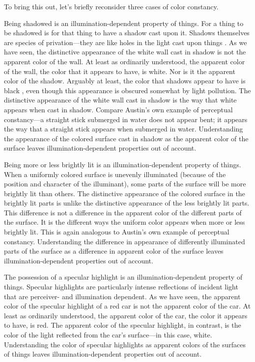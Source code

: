 \documentclass[12pt]{article}
\begin{document}
To bring this out, let's briefly reconsider three cases of color constancy.

Being shadowed is an illumination-dependent property of things. For a thing to be shadowed is for that thing to have a shadow cast upon it. Shadows themselves are species of privation---they are like holes in the light cast upon things \citep[see][]{Sorensen:2008kx}. As we have seen, the distinctive appearance of the white wall cast in shadow is not the apparent color of the wall. At least as ordinarily understood, the apparent color of the wall, the color that it appears to have, is white. Nor is it the apparent color of the shadow. Arguably at least, the color that shadows appear to have is black \citep{Sorensen:2008kx}, even though this appearance is obscured somewhat by light pollution. The distinctive appearance of the white wall cast in shadow is the way that white appears when cast in shadow. Compare Austin's \citeyearpar{Austin:1962lr} own example of perceptual constancy---a straight stick submerged in water does not appear bent; it appears the way that a straight stick appears when submerged in water. Understanding the appearance of the colored surface cast in shadow as the apparent color of the surface leaves illumination-dependent properties out of account.

Being more or less brightly lit is an illumination-dependent property of things. When a uniformly colored surface is unevenly illuminated (because of the position and character of the illuminant), some parts of the surface will be more brightly lit than others. The distinctive appearance of the colored surface in the brightly lit parts is unlike the distinctive appearance of the less brightly lit parts. This difference is not a difference in the apparent color of the different parts of the surface. It is the different ways the uniform color appears when more or less brightly lit. This is again analogous to Austin's own example of perceptual constancy. Understanding the difference in appearance of differently illuminated parts of the surface as a difference in apparent color of the surface leaves illumination-dependent properties out of account.

The possession of a specular highlight is an illumination-dependent property of things. Specular highlights are particularly intense reflections of incident light that are perceiver- and illumination dependent. As we have seen, the apparent color of the specular highlight of a red car is not the apparent color of the car. At least as ordinarily understood, the apparent color of the car, the color it appears to have, is red. The apparent color of the specular highlight, in contrast, is the color of the light reflected from the car's surface---in this case, white. Understanding the color of specular highlights as apparent colors of the surfaces of things leaves illumination-dependent properties out of account.
\end{document}
